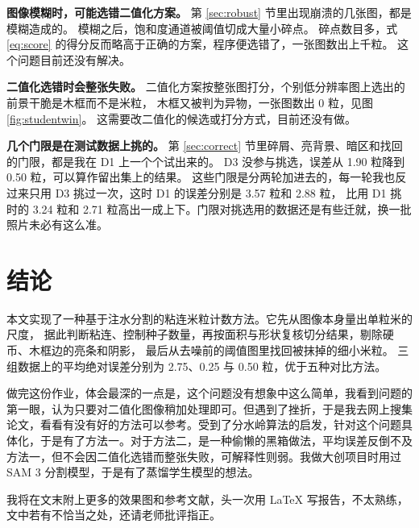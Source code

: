 \textbf{图像模糊时，可能选错二值化方案。}
第 \ref{sec:robust} 节里出现崩溃的几张图，都是模糊造成的。
模糊之后，饱和度通道被阈值切成大量小碎点。
碎点数目多，式 \eqref{eq:score} 的得分反而略高于正确的方案，程序便选错了，一张图数出上千粒。
这个问题目前还没有解决。

\textbf{二值化选错时会整张失败。}
二值化方案按整张图打分，个别低分辨率图上选出的前景干脆是木框而不是米粒，
木框又被判为异物，一张图数出 0 粒，见图 \ref{fig:studentwin}。
这需要改二值化的候选或打分方式，目前还没有做。

\textbf{几个门限是在测试数据上挑的。}
第 \ref{sec:correct} 节里碎屑、亮背景、暗区和找回的门限，都是我在 D1 上一个个试出来的。
D3 没参与挑选，误差从 1.90 粒降到 0.50 粒，可以算作留出集上的结果。
这些门限是分两轮加进去的，每一轮我也反过来只用 D3 挑过一次，这时 D1 的误差分别是 3.57 粒和 2.88 粒，
比用 D1 挑时的 3.24 粒和 2.71 粒高出一成上下。门限对挑选用的数据还是有些迁就，换一批照片未必有这么准。





\section{结论}

本文实现了一种基于注水分割的粘连米粒计数方法。它先从图像本身量出单粒米的尺度，
据此判断粘连、控制种子数量，再按面积与形状复核切分结果，剔除硬币、木框边的亮条和阴影，
最后从去噪前的阈值图里找回被抹掉的细小米粒。
三组数据上的平均绝对误差分别为 2.75、0.25 与 0.50 粒，优于五种对比方法。

做完这份作业，体会最深的一点是，这个问题没有想象中这么简单，我看到问题的第一眼，认为只要对二值化图像稍加处理即可。但遇到了挫折，于是我去网上搜集论文，看看有没有好的方法可以参考。受到了分水岭算法的启发，针对这个问题具体化，于是有了方法一。对于方法二，是一种偷懒的黑箱做法，平均误差反倒不及方法一，但不会因二值化选错而整张失败，可解释性则弱。我做大创项目时用过 SAM 3 分割模型，于是有了蒸馏学生模型的想法。

我将在文末附上更多的效果图和参考文献，头一次用 \LaTeX{} 写报告，不太熟练，文中若有不恰当之处，还请老师批评指正。
